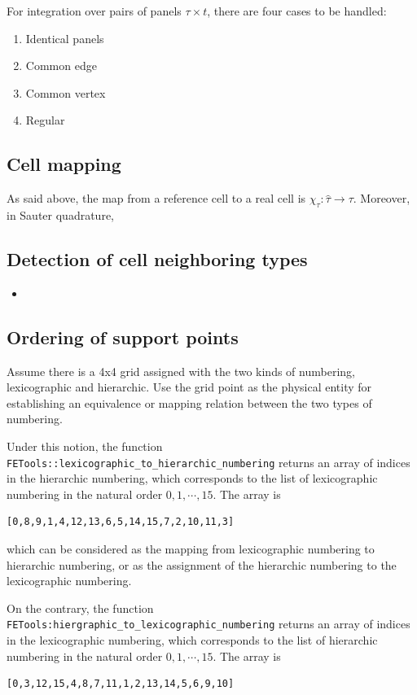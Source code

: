 \documentclass[11pt, a4paper]{article}
\begin{document}
For integration over pairs of panels $\tau\times t$, there are four cases to be handled:
\begin{enumerate}
\item Identical panels
\item Common edge
\item Common vertex
\item Regular
\end{enumerate}

\subsection{Cell mapping}

As said above, the map from a reference cell to a real cell is $\chi_{\tau}: \hat{\tau}
\rightarrow \tau$. Moreover, in Sauter quadrature, 


\subsection{Detection of cell neighboring types}

\begin{itemize}
\item 
\end{itemize}

\subsection{Ordering of support points}

Assume there is a 4x4 grid assigned with the two kinds of numbering, lexicographic and hierarchic. Use the grid point as the physical entity for establishing an equivalence or mapping relation between the two types of numbering.

Under this notion, the function \texttt{FETools::lexicographic\_to\_hierarchic\_numbering} returns an array of indices in the hierarchic numbering, which corresponds to the list of lexicographic numbering in the natural order \(0,1,\cdots,15\). The array is
\begin{lstlisting}[language=text]
[0,8,9,1,4,12,13,6,5,14,15,7,2,10,11,3]
\end{lstlisting}

which can be considered as the mapping from lexicographic numbering to hierarchic numbering, or as the assignment of the hierarchic numbering to the lexicographic numbering.

On the contrary, the function \texttt{FETools:hiergraphic\_to\_lexicographic\_numbering}
returns an array of indices in the lexicographic numbering, which corresponds to the list
of hierarchic numbering in the natural order \(0,1,\cdots,15\). The array is
\begin{lstlisting}[language=text]
[0,3,12,15,4,8,7,11,1,2,13,14,5,6,9,10]
\end{lstlisting}
\end{document}
